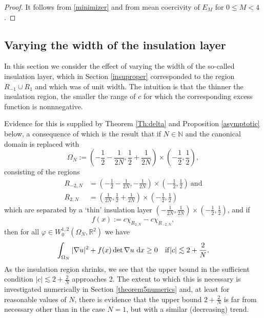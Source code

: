 \documentclass[12pt]{amsart}
\newcommand{\md}{{\rm d}}
\newcommand{\dx}{\, \md x}
\newcommand{\R}{\mathbb{R}}
\newcommand{\N}{\mathbb{N}}
\newcommand{\om}{\Omega}
\newcommand{\1}{{\bf 1}}
\begin{document}
\begin{proof}
It follows from \eqref{minimizer} and from mean coercivity of $E_M$ for $0\le M<4$.
\end{proof}

\subsection{Varying the width of the insulation layer}\label{thinsulate}

In this section we consider the effect of varying the width of the so-called insulation layer, which in Section \ref{insuproper} corresponded to the region $R_{-1} \cup R_{1}$ and which was of unit width. The intuition is that the thinner the insulation region, the smaller the range of $c$ for which the corresponding excess function is nonnnegative. 

Evidence for this is supplied by Theorem \ref{Th:delta} and Proposition \ref{asymptotic} below, a consequence of which is the result that if $N \in\N$ and the canonical domain is replaced with
$$\Omega_{N}:=\left(-\frac{1}{2}-\frac{1}{2N},\frac{1}{2}+\frac{1}{2N}\right) \times \left(-\frac{1}{2}, \frac{1}{2}\right),$$
consisting of the regions 
\begin{align*}R_{-2,N} & =\left(-\frac{1}{2}-\frac{1}{2N},-\frac{1}{2N}\right) \times \left(-\frac{1}{2},\frac{1}{2}\right) \ \mathrm{and} \\
R_{2,N} & =\left(\frac{1}{2N},\frac{1}{2}+\frac{1}{2N}\right) \times \left(-\frac{1}{2},\frac{1}{2}\right)\end{align*} which are separated by a `thin' insulation layer $\left(-\frac{1}{2N},\frac{1}{2N}\right) \times \left(-\frac{1}{2},\frac{1}{2}\right)$, and if 
$$f(x):= c \chi_{R_{2,N}} - c \chi_{R_{-2,N}},$$
then for all $\varphi \in W_0^{1,2}(\om_N,\R^2)$ we have
\begin{align}\label{inequalityN} \int_{\om_N} |\nabla u|^2 + f(x) \det \nabla u \, \dx \geq 0 \quad \mathrm{if}  |c| \lesssim 2 + \frac{2}{N}.\end{align} 
As the insulation region shrinks, we see that the upper bound in the sufficient condition $|c| \lesssim 2 + \frac{2}{N}$ approaches 2.  The extent to which this is necessary is investigated numerically in Section \ref{theorem5numerics} and, at least for reasonable values of $N$, there is evidence that the upper bound $2 + \frac{2}{N}$ is far from necessary other than in the case $N=1$, but with a similar (decreasing) trend.   
\end{document}
